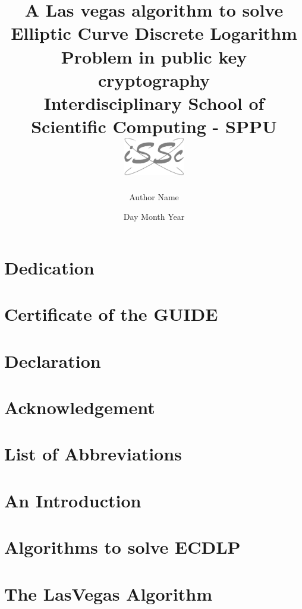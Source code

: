 \documentclass[12pt,twoside]{report}
\title{
    {A Las vegas algorithm to solve Elliptic Curve Discrete Logarithm Problem in public key cryptography}\\
    {\large Interdisciplinary School of Scientific Computing - SPPU}\\
    \includegraphics[width=0.2\textwidth]{issc.jpg}
}
\author{Author Name}
\date{Day Month Year}
\begin{document}
\maketitle

\chapter*{Dedication}


\chapter*{Certificate of the GUIDE}


\chapter*{Declaration}


\chapter*{Acknowledgement}



\tableofcontents

\listoffigures
{}

\listoftables

\chapter*{List of Abbreviations}

\chapter{An Introduction }


\chapter[ECDLP]{Algorithms to solve ECDLP }


\chapter{The LasVegas Algorithm }

\end{document}
